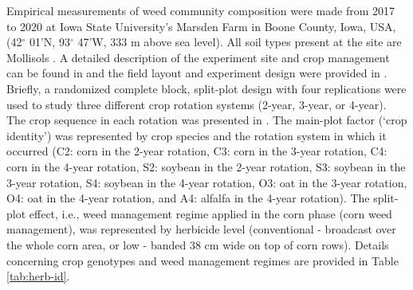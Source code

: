 \documentclass[
]{article}
\begin{document}
Empirical measurements of weed community composition were made from 2017 to 2020 at Iowa State University's Marsden Farm in Boone County, Iowa, USA, (42\(^\circ\) 01'N, 93\(^\circ\) 47'W, 333 m above sea level). All soil types present at the site are Mollisols \citep{chenInfluenceResidueNitrogen2014}. A detailed description of the experiment site and crop management can be found in \citet{liebmanWeedSeedbankDiversity2021} and the field layout and experiment design were provided in \citet{nguyenImpactCroppingSysteminreview}. Briefly, a randomized complete block, split-plot design with four replications were used to study three different crop rotation systems (2-year, 3-year, or 4-year). The crop sequence in each rotation was presented in \citet{nguyenImpactCroppingSysteminreview}. The main-plot factor (`crop identity') was represented by crop species and the rotation system in which it occurred (C2: corn in the 2-year rotation, C3: corn in the 3-year rotation, C4: corn in the 4-year rotation, S2: soybean in the 2-year rotation, S3: soybean in the 3-year rotation, S4: soybean in the 4-year rotation, O3: oat in the 3-year rotation, O4: oat in the 4-year rotation, and A4: alfalfa in the 4-year rotation). The split-plot effect, i.e., weed management regime applied in the corn phase (corn weed management), was represented by herbicide level (conventional - broadcast over the whole corn area, or low - banded 38 cm wide on top of corn rows). Details concerning crop genotypes and weed management regimes are provided in Table \ref{tab:herb-id}.
\end{document}
